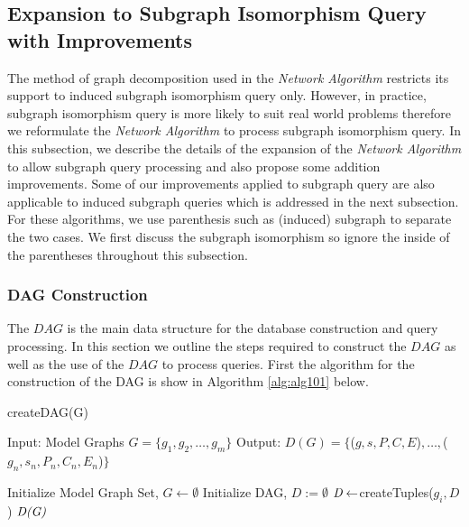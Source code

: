 \subsection{Expansion to Subgraph Isomorphism Query with Improvements}
The method of graph decomposition used in the \textit{Network Algorithm} restricts its  support to induced subgraph isomorphism query only. However, in practice,  subgraph isomorphism query is more likely to suit real world problems therefore we reformulate the \textit{Network Algorithm} to process subgraph isomorphism query.
In this subsection, we describe the details of the expansion of the \textit{Network Algorithm} to allow subgraph query processing and also propose some addition improvements.
Some of our improvements applied to subgraph query are also applicable to induced subgraph queries which is addressed in the next subsection.
For these algorithms, we use parenthesis such as (induced) subgraph to separate the two cases. We first discuss the subgraph isomorphism so ignore the 
inside of the parentheses throughout this subsection.

\subsubsection{DAG Construction}
The $DAG$ is the main data structure for the database construction and query processing. In this section we outline the steps required to construct 
the $DAG$ as well as the use of the $DAG$ to process queries. First the algorithm for the construction of the DAG is show in Algorithm \ref{alg:alg101} below.


\begin{algorithm}
\caption{createDAG(G)}
\label{alg:alg101}
\begin{algorithmic}
\STATE Input: Model Graphs $G =\{g_1,g_2,\dots,g_m\}$
\STATE Output: $D(G)= \{$($g,s,P,C,E$)$,\ldots,$($g_n,s_n,P_n,C_n,E_n$)$ \}$
\end{algorithmic}
\begin{algorithmic}[1]
\STATE Initialize Model Graph Set, $G \leftarrow \emptyset$
\STATE Initialize DAG, $D:=\emptyset$
 \STATE  $\emph{D} \leftarrow $createTuples($g_i,D$)
\ENDFOR
\RETURN $\emph{D(G)}$
\end{algorithmic}
\end{algorithm}



